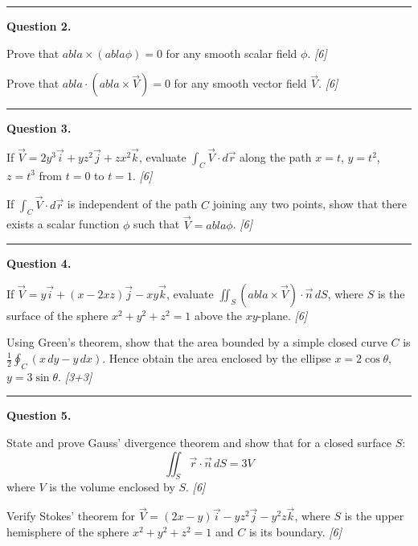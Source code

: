 \documentclass[11pt,a4paper]{article}
\newcommand{\pts}[1]{\hfill   \textit{[#1]}}
\begin{document}
\medskip\rule{\linewidth}{0.2pt}

\medskip


\noindent   \textbf{Question 2.}

\begin{parts}
  \item Prove that $
abla  \times (
abla \phi) = 0$ for any smooth scalar field $\phi$. \pts{6}
  \item Prove that $
abla \cdot (
abla  \times \vec{V}) = 0$ for any smooth vector field $\vec{V}$. \pts{6}
\end{parts}

\medskip\rule{\linewidth}{0.2pt}

\medskip


\noindent   \textbf{Question 3.}

\begin{parts}
  \item If $\vec{V} = 2y^3\vec{i} + yz^2\vec{j} + zx^2\vec{k}$, evaluate $\int_C \vec{V} \cdot d\vec{r}$ along the path $x=t$, $y=t^2$, $z=t^3$ from $t=0$ to $t=1$. \pts{6}
  \item If $\int_C \vec{V} \cdot d\vec{r}$ is independent of the path $C$ joining any two points, show that there exists a scalar function $\phi$ such that $\vec{V} = 
abla\phi$. \pts{6}
\end{parts}

\medskip\rule{\linewidth}{0.2pt}

\medskip


\noindent   \textbf{Question 4.}

\begin{parts}
  \item If $\vec{V} = y\vec{i} + (x - 2xz)\vec{j} - xy\vec{k}$, evaluate $\iint_S (
abla  \times \vec{V}) \cdot \vec{n} \, dS$, where $S$ is the surface of the sphere $x^2 + y^2 + z^2 = 1$ above the $xy$-plane. \pts{6}
  \item Using Green's theorem, show that the area bounded by a simple closed curve $C$ is $\frac{1}{2} \oint_C (x\,dy - y\,dx)$. Hence obtain the area enclosed by the ellipse $x = 2\cos \theta$, $y = 3\sin \theta$. \pts{3+3}
\end{parts}

\medskip\rule{\linewidth}{0.2pt}

\medskip


\noindent   \textbf{Question 5.}

\begin{parts}
  \item State and prove Gauss' divergence theorem and show that for a closed surface $S$:
  \[
  \iint_S \vec{r} \cdot \vec{n} \, dS = 3V
  \]
  where $V$ is the volume enclosed by $S$. \pts{6}
  \item Verify Stokes' theorem for $\vec{V} = (2x - y)\vec{i} - yz^2\vec{j} - y^2 z\vec{k}$, where $S$ is the upper hemisphere of the sphere $x^2 + y^2 + z^2 = 1$ and $C$ is its boundary. \pts{6}
\end{parts}
\end{document}
